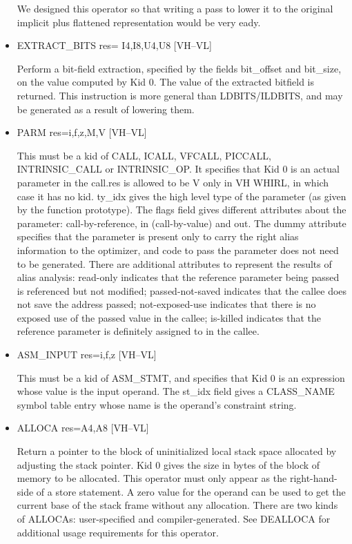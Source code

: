 \begin{itemize}
We designed this operator so that writing a pass to lower it to the
original implicit plus flattened representation would be very eady.


%
\item  EXTRACT\_BITS res= I4,I8,U4,U8 \hfill [VH--VL]

Perform a bit-field extraction, specified by the fields bit\_offset
and bit\_size, on the value computed by Kid 0. The value of the
extracted bitfield is returned. This instruction is more general
than
%
%
LDBITS/ILDBITS, and may be generated as a result of lowering
them.


\item
{}%
PARM res=i,f,z,M,V \hfill [VH--VL]

This must be a kid of CALL, ICALL, VFCALL,
%
PICCALL, 
%
INTRINSIC\_CALL or
%
INTRINSIC\_OP. It specifies that Kid 0 is an actual parameter in
the call.res is allowed to be V only in VH WHIRL, in which case it
has no kid.
ty\_idx gives the high level type of the parameter (as given by the
function prototype). The flags field gives different attributes
about the parameter: call-by-reference, in (call-by-value) and out.
The dummy attribute specifies that the parameter is present only
to carry the right alias information to the optimizer, and code to
pass the parameter does not need to be generated. There are
additional attributes to represent the results of alias analysis:
read-only indicates that the reference parameter being passed
is referenced but not modified; passed-not-saved indicates that the
callee does not save the address passed; not-exposed-use indicates
that there is no exposed use of the passed value in the callee;
is-killed indicates that the reference parameter is definitely
assigned to in the callee. 

%
\item  ASM\_INPUT res=i,f,z \hfill [VH--VL]

This must be a kid of ASM\_STMT, and specifies that Kid 0 is an
expression whose value is the input operand. The st\_idx field
gives a CLASS\_NAME symbol table entry whose name is the operand's constraint
string.

\item
{}%
ALLOCA res=A4,A8 \hfill [VH--VL]

Return a pointer to the block of uninitialized local stack space
allocated by adjusting the stack pointer. Kid 0 gives the size in
bytes of the block of
memory to be allocated. This operator must only appear as the
right-hand-side of a store statement. A zero value for the operand
can be used to get the current base of the stack frame without any
allocation. There are two kinds of
%
ALLOCAs: user-specified and compiler-generated. See
%
DEALLOCA for
additional usage requirements for this operator.

\end{itemize}
